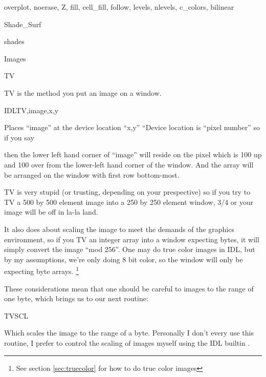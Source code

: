 \documentclass{article}
\begin{document}
	       overplot, noerase, Z, fill, cell\_fill, follow, levels,
               nlevels, c\_colors, bilinear

	     \item Shade\_Surf

	       shades

	   \ei
       \ei

    \item Images
       \bi
         \item TV

	   TV is the method you put an image on a window.

	   IDL{TV,image,x,y}

            Places ``image'' at the device location
            ``x,y'' ``Device location is ``pixel number'' so if you
            say 


            then the lower left hand corner of
            ``image'' will reside on the pixel which is 100 up and 100
            over from the lower-left hand corner of the window. And
            the array will be arranged on the window with first row
            bottom-most.

 	   TV is very stupid (or trusting, depending on your
            prespective) so if you try to TV a 500 by 500 element
            image into a 250 by 250 element window, 3/4 or your image
            will be off in la-la land.
	
	    It also does  about scaling the image to
            meet the demands of the graphics environment, so if you TV
            an integer array into a window expecting bytes, it will
            simply convert the image ``mod 256''.  One may do true
            color images in IDL, but by my assumptions, we're only
            doing 8 bit color, so the window will only be expecting
            byte arrays. \footnote{ See section \ref{sec:truecolor}
            for how to do true color images} 

	    These considerations mean that one should be careful to
             images to the range of one byte, which brings
            us to our next routine:
       

         \item TVSCL

	    Which scales the image to the range of a byte. Personally
            I don't every use this routine, I prefer to control the
            scaling of images myself using the IDL builtin
            .
\end{document}
